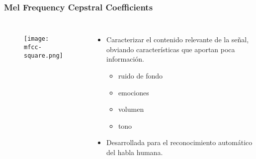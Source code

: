 \begin{frame}
    \frametitle{Mel Frequency Cepstral Coefficients}

    \begin{columns}

        \begin{figure}[!h]
            \centering
            \texttt{[image: mfcc-square.png]}
        \end{figure}

        \pause

        \begin{itemize}
            \item<2-> Caracterizar el contenido relevante de la señal, obviando características que aportan poca información.
            \begin{itemize}
                \item<3-> ruido de fondo
                \item<3-> emociones
                \item<3-> volumen
                \item<3-> tono
            \end{itemize}
            \item<4-> Desarrollada para el reconocimiento automático del habla humana.
        \end{itemize}

    \end{columns}
\end{frame}


